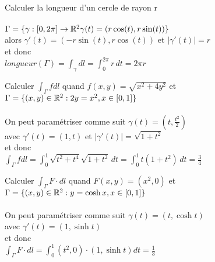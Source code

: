 \begin{myExample}
Calculer la longueur d'un cercle de rayon r
\\\\
$\Gamma=\{\gamma:[0,2\pi]\rightarrow\mathbb{R}^2 \gamma(t)=(r\cos(t),r\sin(t))\}$
\\
alors $\gamma'(t)=(-r\sin(t),r\cos(t))$ et $|\gamma'(t)|=r$
\\
et donc 
\\
$longueur(\Gamma)=\int_\gamma dl=\int_0^{2\pi} r\,dt=2\pi r$
\end{myExample}
\begin{myExample}
	Calculer $\int_\Gamma f dl$ quand $f(x,y)=\sqrt{x^2+4y^2}$ et
	\\
	$\Gamma = \{(x,y)\in\mathbb{R}^2:2y=x^2,x\in[0,1]\}$
	\\\\
	On peut paramétriser comme suit $\gamma(t)=(t, \frac{t^2}{2})$
	\\
	avec $\gamma'(t)=(1,t)$ et $|\gamma'(t)|=\sqrt{1+t^2}$
	\\
	et donc
	\\
	$\int_\Gamma fdl=\int_0^1 \sqrt{t^2+t^4}\sqrt{1+t^2}\,dt=\int_0^1 t(1+t^2)\,dt=\frac{3}{4}$
\end{myExample}

\begin{myExample}
	Calculer $\int_\Gamma F\cdot dl$ quand $F(x,y)=(x^2,0)$ et
	\\
	$\Gamma = \{(x,y)\in\mathbb{R}^2:y=\cosh x,x\in[0,1]\}$
	\\\\
	On peut paramétriser comme suit $\gamma(t)=(t, \cosh t)$
	\\
	avec $\gamma'(t)=(1,\sinh t)$
	\\
	et donc
	\\
	$\int_\Gamma F\cdot dl=\int_0^1 (t^2,0)\cdot(1,\sinh t)dt=\frac{1}{3}$
\end{myExample}

